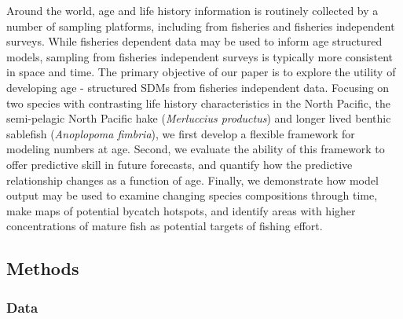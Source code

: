 \documentclass[
]{article}
\begin{document}
Around the world, age and life history information is routinely
collected by a number of sampling platforms, including from fisheries
and fisheries independent surveys. While fisheries dependent data may be
used to inform age structured models, sampling from fisheries
independent surveys is typically more consistent in space and time. The
primary objective of our paper is to explore the utility of developing
age - structured SDMs from fisheries independent data. Focusing on two
species with contrasting life history characteristics in the North
Pacific, the semi-pelagic North Pacific hake (\emph{Merluccius
productus}) and longer lived benthic sablefish (\emph{Anoplopoma
fimbria}), we first develop a flexible framework for modeling numbers at
age. Second, we evaluate the ability of this framework to offer
predictive skill in future forecasts, and quantify how the predictive
relationship changes as a function of age. Finally, we demonstrate how
model output may be used to examine changing species compositions
through time, make maps of potential bycatch hotspots, and identify
areas with higher concentrations of mature fish as potential targets of
fishing effort.

\subsection{Methods}\label{methods}

\subsubsection{Data}\label{data}
\end{document}
